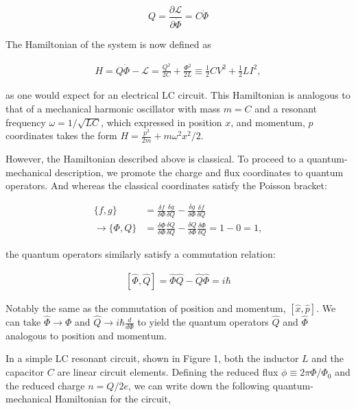 \documentclass[svgnames]{article}     %
\begin{document}
\[
  Q = \frac{\partial \mathcal{L}}{\partial \dot{\Phi}} = C \dot{\Phi}
\] \vspace{3px}

The Hamiltonian of the system is now defined as 

\begin{align}
  H = Q\dot{\Phi} - \mathcal{L} = \frac{Q^2}{2C} + \frac{\Phi^2}{2L} \equiv
  \frac{1}{2}CV^2 + \frac{1}{2}LI^2, 
\end{align} \vspace{3px}


as one would expect for an electrical LC circuit. This Hamiltonian is
analogous  to that of a mechanical harmonic oscillator with mass $m = C$ and
a resonant frequency $\omega = 1 / \sqrt{LC}$, which expressed in position $x$,
and momentum, $p$ coordinates takes the form $H = \frac{p^2}{2m} + m\omega^2
x^2 / 2$.

However, the Hamiltonian described above is classical. To proceed to
a quantum-mechanical description, we promote the charge and flux coordinates to
quantum operators. And whereas the classical coordinates satisfy the Poisson
bracket: 

\begin{align*}
  \{f, g\} &= \frac{\delta f}{\delta \Phi} \frac{\delta g}{\delta Q}
  - \frac{\delta g}{\delta \Phi} \frac{\delta f}{\delta Q} \\ 
  \rightarrow \{ \Phi, Q \} &= \frac{\delta \Phi}{\delta \Phi} \frac{\delta
  Q}{\delta Q} - \frac{\delta Q}{\delta \Phi} \frac{\delta \Phi}{\delta Q}
  = 1 - 0 = 1, 
\end{align*}

the quantum operators similarly satisfy a commutation relation: 

\begin{align} \label{}
  [ \hat{\Phi}, \hat{Q} ] = \hat{\Phi} \hat{Q} - \hat{Q} \hat{\Phi} = i\hbar
\end{align}\vspace{3px}

Notably the same as the commutation of position and momentum, $[\hat{x},
\hat{p}]$. We can take $\hat{\Phi} \rightarrow \Phi$ and $\hat{Q} \rightarrow
i\hbar \frac{d }{d \Phi} $ to yield the quantum operators $\hat{Q}$ and $
\hat{\Phi}$ analogous to position and momentum. 

In a simple LC resonant circuit, shown in Figure 1, both the inductor $L$ and
the capacitor $C$ are linear circuit elements. Defining the reduced flux $\phi
\equiv 2\pi \Phi / \Phi_0$ and the reduced charge $n = Q / 2e$, we can write
down the following quantum-mechanical Hamiltonian for the circuit, 
\end{document}
